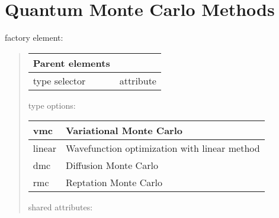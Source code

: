 \documentclass[letterpaper,10pt,english]{sphinxmanual}
\begin{document}
\chapter{Quantum Monte Carlo Methods}
\label{\detokenize{methods:quantum-monte-carlo-methods}}\label{\detokenize{methods:qmcmethods}}\label{\detokenize{methods::doc}}
 factory element:
\begin{quote}


\begin{savenotes}\sphinxattablestart
\centering
\begin{tabulary}{\linewidth}[t]{|T|T|}
\hline

Parent elements
&
\\
\hline
type selector
&
 attribute
\\
\hline
\end{tabulary}
\par
\sphinxattableend\end{savenotes}

type options:


\begin{savenotes}\sphinxattablestart
\centering
\begin{tabulary}{\linewidth}[t]{|T|T|}
\hline

vmc
&
Variational Monte Carlo
\\
\hline
linear
&
Wavefunction optimization with linear method
\\
\hline
dmc
&
Diffusion Monte Carlo
\\
\hline
rmc
&
Reptation Monte Carlo
\\
\hline
\end{tabulary}
\par
\sphinxattableend\end{savenotes}

shared attributes:



\end{quote}
\end{document}
